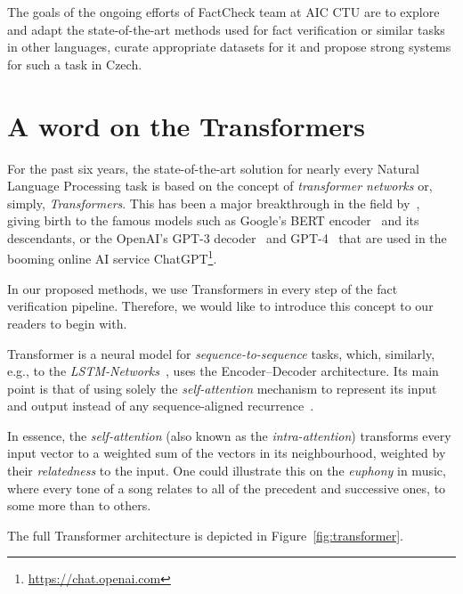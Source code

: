The goals of the ongoing efforts of {\textsf{FactCheck}} team at {\textsf{AIC CTU}} are to explore and adapt the state-of-the-art methods used for fact verification or similar tasks in other languages, curate appropriate datasets for it and propose strong systems for such a task in Czech.


\section{A word on the Transformers}
\label{sec:transformers}
For the past six years, the state-of-the-art solution for nearly every Natural Language Processing task is based on the concept of \textit{transformer networks} or, simply, \textit{Transformers}. This has been a major breakthrough in the field by~\cite{vaswani}, giving birth to the famous models such as \textsf{Google}'s \textsf{BERT} encoder~\cite{devlin2019bert} and its descendants, or the \textsf{OpenAI}'s \textsf{GPT-3} decoder~\cite{gpt3} and \textsf{GPT-4}~\cite{gpt4} that are used in the booming online AI service \textsf{ChatGPT}\footnote{\url{https://chat.openai.com}}.

In our proposed methods, we use Transformers in every step of the fact verification pipeline. Therefore, we would like to introduce this concept to our readers to begin with. 

Transformer is a neural model for \textit{sequence-to-sequence} tasks, which, similarly, e.g., to the \textit{LSTM-Networks}~\cite{lstm}, uses the Encoder--Decoder architecture. Its main point is that of using solely the \textit{self-attention} mechanism to represent its input and output instead of any sequence-aligned recurrence~\cite{vaswani}.

In essence, the \textit{self-attention} (also known as the \textit{intra-attention}) transforms every input vector to a weighted sum of the vectors in its neighbourhood, weighted by their \textit{relatedness} to the input. One could illustrate this on the \textit{euphony} in music, where every tone of a song relates to all of the precedent and successive ones, to some more than to others.

The full Transformer architecture is depicted in Figure~\ref{fig:transformer}.

